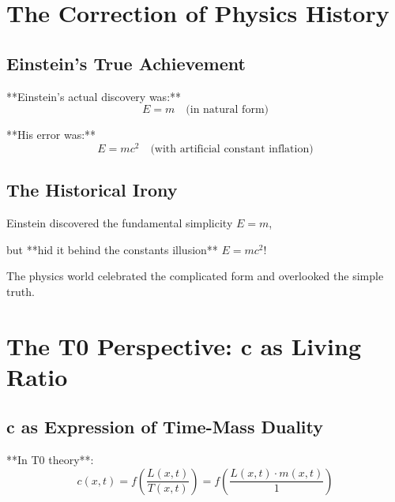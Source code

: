 \documentclass[12pt,a4paper]{article}
\newcommand{\Tfield}{T}
\begin{document}
{{{{{{{{{{{												\section{The Correction of Physics History}
												
												\subsection{Einstein's True Achievement}
												
												**Einstein's actual discovery was:**
												\begin{equation}
													E = m \quad \text{(in natural form)}
												\end{equation}
												
												**His error was:**
												\begin{equation}
													E = mc^2 \quad \text{(with artificial constant inflation)}
												\end{equation}
												
												\subsection{The Historical Irony}
												
												\begin{tcolorbox}[colback=blue!5!white,colframe=blue!75!black,title=The Great Irony]
													Einstein discovered the fundamental simplicity $E = m$, 
													
													but **hid it behind the constants illusion** $E = mc^2$!
													
													The physics world celebrated the complicated form and overlooked the simple truth.
												\end{tcolorbox}
												
												\section{The T0 Perspective: c as Living Ratio}
												
												\subsection{c as Expression of Time-Mass Duality}
												
												**In T0 theory**:
												\begin{equation}
													c(x,t) = f\left(\frac{L(x,t)}{\Tfield(x,t)}\right) = f\left(\frac{L(x,t) \cdot m(x,t)}{1}\right)
												\end{equation}
												
}}}}}}}}}}}
\end{document}

